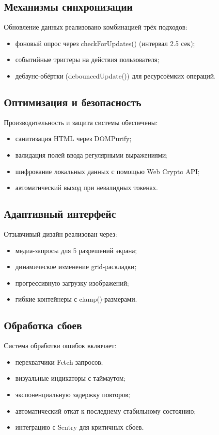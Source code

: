 		\subsection{Механизмы синхронизации}  
		Обновление данных реализовано комбинацией трёх подходов:  
		\begin{itemize}  
			\item фоновый опрос через checkForUpdates() (интервал 2.5 сек);  
			\item событийные триггеры на действия пользователя;  
			\item дебаунс-обёртки (debouncedUpdate()) для ресурсоёмких операций.  
		\end{itemize}  
		
		\subsection{Оптимизация и безопасность}  
		Производительность и защита системы обеспечены:  
		\begin{itemize}  
			\item санитизация HTML через DOMPurify;  
			\item валидация полей ввода регулярными выражениями;  
			\item шифрование локальных данных с помощью Web Crypto API;  
			\item автоматический выход при невалидных токенах.  
		\end{itemize}  
		
		\subsection{Адаптивный интерфейс}  
		Отзывчивый дизайн реализован через:  
		\begin{itemize}  
			\item медиа-запросы для 5 разрешений экрана;  
			\item динамическое изменение grid-раскладки;  
			\item прогрессивную загрузку изображений;  
			\item гибкие контейнеры с clamp()-размерами.  
		\end{itemize}  
		
		\subsection{Обработка сбоев}  
		Система обработки ошибок включает:  
		\begin{itemize}  
			\item перехватчики Fetch-запросов;  
			\item визуальные индикаторы с таймаутом;  
			\item экспоненциальную задержку повторов;  
			\item автоматический откат к последнему стабильному состоянию;  
			\item интеграцию с Sentry для критичных сбоев.  
		\end{itemize}  
